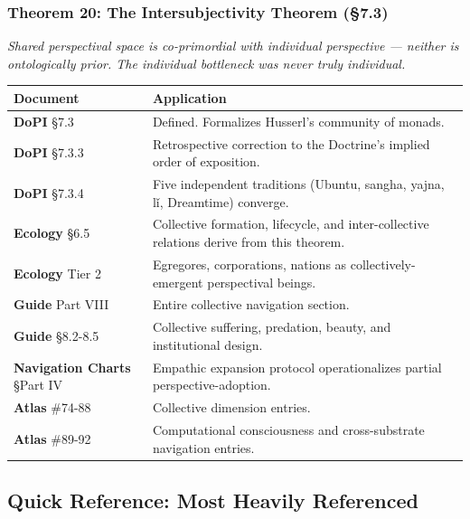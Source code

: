 \subsubsection*{Theorem 20: The Intersubjectivity Theorem (§7.3)}


\textit{Shared perspectival space is co-primordial with individual perspective — neither is ontologically prior. The individual bottleneck was never truly individual.}



\begin{longtable}{>{\raggedright\arraybackslash}p{} >{\raggedright\arraybackslash}p{}}
\toprule
\textbf{Document} & \textbf{Application} \\
\midrule
\endhead
\textbf{DoPI} §7.3 & Defined. Formalizes Husserl's community of monads. \\
\textbf{DoPI} §7.3.3 & Retrospective correction to the Doctrine's implied order of exposition. \\
\textbf{DoPI} §7.3.4 & Five independent traditions (Ubuntu, sangha, yajna, l\v{i}, Dreamtime) converge. \\
\textbf{Ecology} §6.5 & Collective formation, lifecycle, and inter-collective relations derive from this theorem. \\
\textbf{Ecology} Tier 2 & Egregores, corporations, nations as collectively-emergent perspectival beings. \\
\textbf{Guide} Part VIII & Entire collective navigation section. \\
\textbf{Guide} §8.2-8.5 & Collective suffering, predation, beauty, and institutional design. \\
\textbf{Navigation Charts} §Part IV & Empathic expansion protocol operationalizes partial perspective-adoption. \\
\textbf{Atlas} \#74-88 & Collective dimension entries. \\
\textbf{Atlas} \#89-92 & Computational consciousness and cross-substrate navigation entries. \\
\bottomrule
\end{longtable}



\bigskip\noindent\makebox[\textwidth]{\color{rulegray}\rule{5cm}{0.3pt}}\bigskip


\subsection*{Quick Reference: Most Heavily Referenced}



